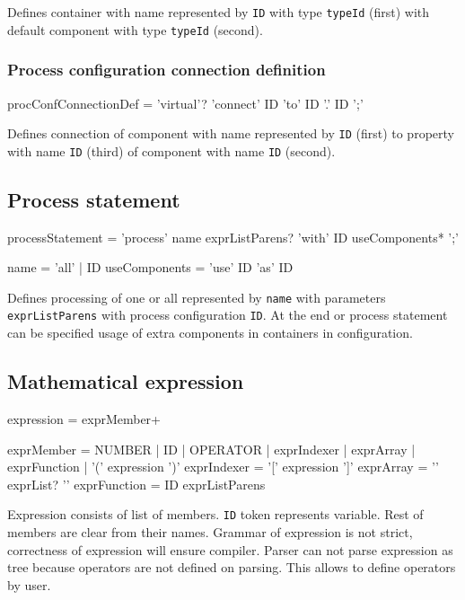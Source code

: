 Defines container with name represented by \texttt{ID} with type \texttt{typeId} (first) with default component with type \texttt{typeId} (second).


\subsubsection{Process configuration connection definition}
\begin{Grammar}
procConfConnectionDef = 'virtual'? 'connect' ID 'to' ID '.' ID ';'
\end{Grammar}

Defines connection of component with name represented by \texttt{ID} (first) to property with name \texttt{ID} (third) of component with name \texttt{ID} (second).


\subsection{Process statement}
\begin{Grammar}
processStatement = 'process' name exprListParens?
	'with' ID useComponents* ';'

name = 'all' | ID
useComponents = 'use' ID 'as' ID
\end{Grammar}

Defines processing of one or all \lsystems represented by \texttt{name} with parameters \texttt{exprListParens} with process configuration \texttt{ID}.
At the end or process statement can be specified usage of extra components in containers in configuration.



\subsection{Mathematical expression}

\begin{Grammar}
expression = exprMember+

exprMember = NUMBER
	| ID
	| OPERATOR
	| exprIndexer
	| exprArray
	| exprFunction
	| '(' expression ')'
exprIndexer = '[' expression ']'
exprArray = '{' exprList? '}'
exprFunction = ID exprListParens
\end{Grammar}

Expression consists of list of members.
\texttt{ID} token represents variable.
Rest of members are clear from their names.
Grammar of expression is not strict, correctness of expression will ensure compiler.
Parser can not parse expression as tree because operators are not defined on parsing.
This allows to define operators by user.



